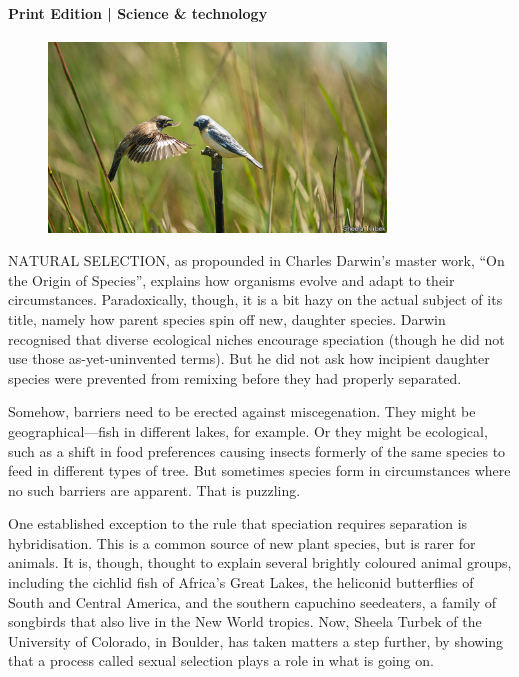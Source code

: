 \documentclass{article}
\begin{document}
\paragraph{Print Edition | Science \& technology  \quad \color{gray}{Mar 27th 2021 }}
\begin{figure}[h]
\centering
\includegraphics[width=0.8\textwidth]{images/20210327_STP001_0.jpg}
\end{figure}
\lettrine{N}ATURAL SELECTION, as propounded in Charles Darwin's master work, ``On the Origin of Species'', explains how organisms evolve and adapt to their circumstances. Paradoxically, though, it is a bit hazy on the actual subject of its title, namely how parent species spin off new, daughter species. Darwin recognised that diverse ecological niches encourage speciation (though he did not use those as-yet-uninvented terms). But he did not ask how incipient daughter species were prevented from remixing before they had properly separated. 

Somehow, barriers need to be erected against miscegenation. They might be geographical---fish in different lakes, for example. Or they might be ecological, such as a shift in food preferences causing insects formerly of the same species to feed in different types of tree. But sometimes species form in circumstances where no such barriers are apparent. That is puzzling. 

One established exception to the rule that speciation requires separation is hybridisation. This is a common source of new plant species, but is rarer for animals. It is, though, thought to explain several brightly coloured animal groups, including the cichlid fish of Africa's Great Lakes, the heliconid butterflies of South and Central America, and the southern capuchino seedeaters, a family of songbirds that also live in the New World tropics. Now, Sheela Turbek of the University of Colorado, in Boulder, has taken matters a step further, by showing that a process called sexual selection plays a role in what is going on. 
\end{document}
